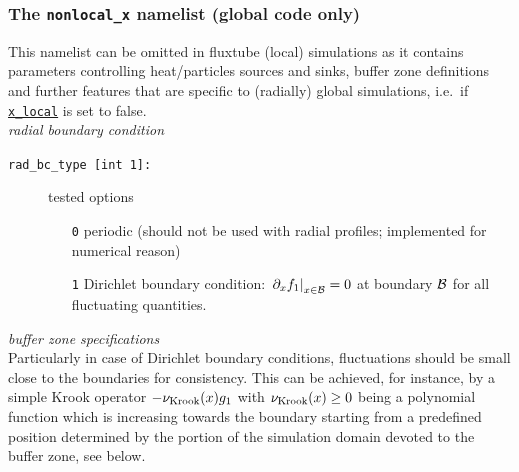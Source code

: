 \documentclass[12pt]{article}
\begin{document}
\subsubsection{The \texttt{nonlocal\_x} namelist (global code only)}
\hypertarget{nonlocal_x_nml}{}
This namelist can be omitted in fluxtube (local) simulations as it contains parameters controlling heat/particles
sources and sinks, buffer zone definitions and further features that are specific to (radially) global simulations,
i.e.~if \hyperlink{x_local}{\texttt{x\_local}} is set to false.\\[1ex]
%
{\em radial boundary condition}
\begin{description}
 \item [\texttt{rad\_bc\_type [int 1]:}] tested options
 \begin{itemize}
 \item[{\tt 0}] periodic (should not be used with radial profiles; implemented for numerical reason)
 \item[{\tt 1}] Dirichlet boundary condition: $\left.\partial_x f_1\right|_{x\in {\cal B}} = 0$ at boundary ${\cal B}$
 for all fluctuating quantities.
 \end{itemize}


\end{description}
%
{\em buffer zone specifications}\\[1ex]
Particularly in case of Dirichlet boundary conditions, fluctuations should be small close to the boundaries for consistency.
This can be achieved, for instance, by a simple Krook operator $-\nu_{\rm Krook}(x) g_1$ with $\nu_{\rm Krook}(x)\geq 0$ being a polynomial function
which is increasing towards the boundary starting from a predefined position determined by the portion of the simulation domain devoted to the
buffer zone, see below.
\end{document}
